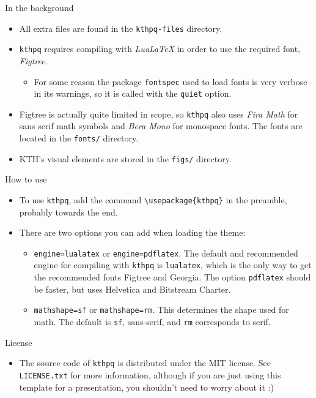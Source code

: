 \documentclass[17pt, t, lualatex]{beamer}
\def\kthpq{\texttt{kthpq}}
\begin{document}
\begin{frame}{In the background}
\begin{itemize}
\item All extra files are found in the \texttt{kthpq-files} directory.
\item \kthpq{} requires compiling with \emph{LuaLaTeX} in order to use the required font, \emph{Figtree}.
\begin{itemize}
\item For some reason the package \texttt{fontspec} used to load fonts is very verbose in its warnings, so it is called with the \texttt{quiet} option.
\end{itemize}
\item Figtree is actually quite limited in scope, so \kthpq{} also uses \emph{Fira Math} for sans serif math symbols and \emph{Bera Mono} for monospace fonts. The fonts are located in the \texttt{fonts/} directory.
\item KTH's visual elements are stored in the \texttt{figs/} directory.
\end{itemize}
\end{frame}

\begin{frame}[fragile=singleslide]{How to use}
\begin{itemize}
\item To use \kthpq{}, add the command \verb|\usepackage{kthpq}| in the preamble, probably towards the end.
\item There are two options you can add when loading the theme:
\begin{itemize}
\item \texttt{engine=lualatex} or \texttt{engine=pdflatex}. The default and recommended engine for compiling with \kthpq{} is \texttt{lualatex}, which is the only way to get the recommended fonts Figtree and Georgia. The option \texttt{pdflatex} should be faster, but uses Helvetica and Bitstream Charter.
\item \texttt{mathshape=sf} or \texttt{mathshape=rm}. This determines the shape used for math. The default is \texttt{sf}, sans-serif, and \texttt{rm} corresponds to serif.
\end{itemize}
\end{itemize}
\end{frame}

\begin{frame}{License}
\begin{itemize}
\item The source code of \kthpq{} is distributed under the MIT license. See \texttt{LICENSE.txt} for more information, although if you are just using this template for a presentation, you shouldn't need to worry about it :)
\end{itemize}
\end{frame}
\end{document}
